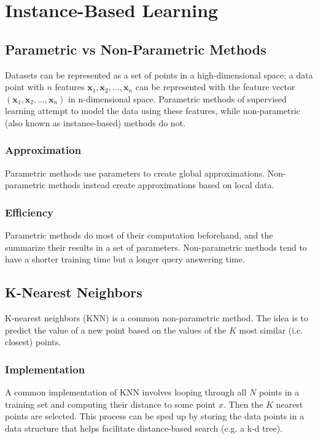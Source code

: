 \documentclass[12pt]{article}
\begin{document}
\section{Instance-Based Learning}
    \subsection{Parametric vs Non-Parametric Methods}
        Datasets can be represented as a set of points in a high-dimensional space; a data point with $n$ features $\boldsymbol{x}_1, \boldsymbol{x}_2, ..., \boldsymbol{x}_n$ can be represented
        with the feature vector $(\boldsymbol{x}_1, \boldsymbol{x}_2, ..., \boldsymbol{x}_n)$ in n-dimensional space. Parametric methods of supervised learning attempt to model the data using
        these features, while non-parametric (also known as instance-based) methods do not.

        \subsubsection{Approximation}
            Parametric methods use parameters to create global approximations. Non-parametric methods instead create approximations based on local data.

        \subsubsection{Efficiency}
            Parametric methods do most of their computation beforehand, and the summarize their results in a set of parameters. Non-parametric methods tend to
            have a shorter training time but a longer query answering time.

    \subsection{K-Nearest Neighbors}
        K-nearest neighbors (KNN) is a common non-parametric method. The idea is to predict the value of a new point based on the values of the $K$ most similar
        (i.e. closest) points.

        \subsubsection{Implementation}
            A common implementation of KNN involves looping through all $N$ points in a training set and computing their distance to some point $x$. Then the $K$ nearest
            points are selected. This process can be sped up by storing the data points in a data structure that helps facilitate distance-based search (e.g. a k-d tree).
\end{document}
